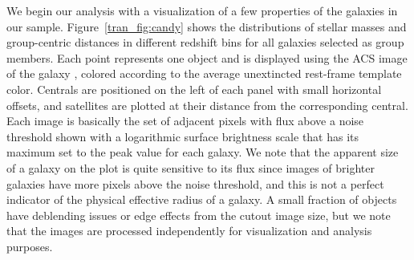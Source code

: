 \begin{figure*}[htb]
\caption{Group members as a function of stellar mass and distance from
  the group center. Colors for each galaxy represent the average
  unextincted rest-frame template \nuvr color, with shading
  proportional to the logarithmic surface brightness $\mu$. The gray
  band at the bottom of the high-redshift panels shows the stellar
  mass completeness limit for a passive population calculated with our
  flux limits F814W $ = 24.2$ and $K_s=24$ following the approach of
  \citet{Bundy2010} \citep[see also Figure 1
  of][]{George2011}. Central galaxies in these groups are shown in the
  light gray band on the left side of each of the outer panels. The
  middle frame shows morphological classifications for a random sample
  of galaxies chosen to span the range of colors observed; objects in
  this panel are sorted vertically by color and horizontal offsets
  within each classification are arbitrary.}
\label{tran_fig:candy}
\end{figure*}
 
We begin our analysis with a visualization of a few properties of the
galaxies in our sample. Figure~\ref{tran_fig:candy} shows the distributions
of stellar masses and group-centric distances in different redshift
bins for all galaxies selected as group members. Each point represents
one object and is displayed using the ACS image of the galaxy \citep{Koekemoer2007}, colored
according to the average unextincted rest-frame template \nuvr
color. Centrals are positioned on the left of each panel with small
horizontal offsets, and satellites are plotted at their distance from
the corresponding central. Each image is basically the set of adjacent
pixels with flux above a noise threshold shown with a logarithmic
surface brightness scale that has its maximum set to the peak value
for each galaxy.  We note that the apparent size of a galaxy on the
plot is quite sensitive to its flux since images of brighter galaxies
have more pixels above the noise threshold, and this is not a perfect
indicator of the physical effective radius of a galaxy. A small
fraction of objects have deblending issues or edge effects from the
cutout image size, but we note that the images are processed
independently for visualization and analysis purposes.
 
